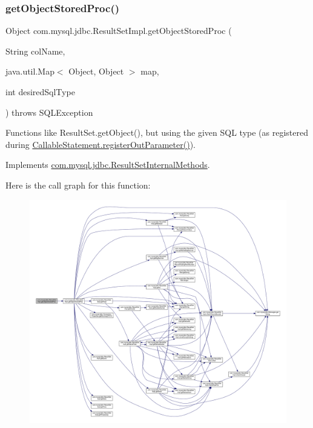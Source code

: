 \subsubsection{\texorpdfstring{get\+Object\+Stored\+Proc()}{getObjectStoredProc()}\hspace{0.1cm}{\footnotesize\ttfamily [4/4]}}
{\footnotesize\ttfamily Object com.\+mysql.\+jdbc.\+Result\+Set\+Impl.\+get\+Object\+Stored\+Proc (\begin{DoxyParamCaption}\item[{String}]{col\+Name,  }\item[{java.\+util.\+Map$<$ Object, Object $>$}]{map,  }\item[{int}]{desired\+Sql\+Type }\end{DoxyParamCaption}) throws S\+Q\+L\+Exception}

Functions like Result\+Set.\+get\+Object(), but using the given S\+QL type (as registered during \mbox{\hyperlink{classcom_1_1mysql_1_1jdbc_1_1_callable_statement_a5158af0506cf90040062b2049550f59b}{Callable\+Statement.\+register\+Out\+Parameter()}}). 

Implements \mbox{\hyperlink{interfacecom_1_1mysql_1_1jdbc_1_1_result_set_internal_methods_ac4bc017d69d3768d7000126d47a77866}{com.\+mysql.\+jdbc.\+Result\+Set\+Internal\+Methods}}.

Here is the call graph for this function\+:
\nopagebreak
\begin{figure}[H]
\begin{center}
\leavevmode
\includegraphics[width=350pt]{classcom_1_1mysql_1_1jdbc_1_1_result_set_impl_a9d1a5e010a5b824c7c8019dea3ce23e9_cgraph}
\end{center}
\end{figure}
\mbox{\label{classcom_1_1mysql_1_1jdbc_1_1_result_set_impl_a1ac9c4862814fa6b5439c71a4f4cdac8}} 
